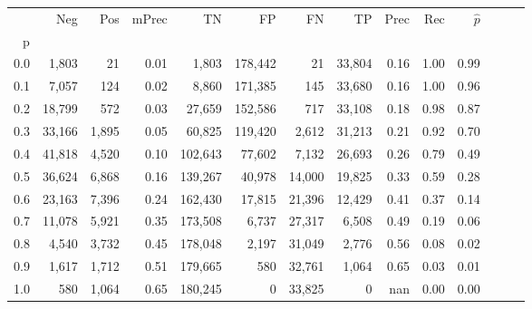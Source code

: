 \begin{tabular}{rrrrrrrrrrrrrr}
\toprule
{} &     Neg &    Pos & mPrec &       TN &       FP &      FN &      TP &  Prec &   Rec & $\hat{p}$ \\
p   &         &        &       &          &          &         &         &       &       &           \\
\midrule
0.0 &   1,803 &     21 &  0.01 &    1,803 &  178,442 &      21 &  33,804 &  0.16 &  1.00 &      0.99 \\
0.1 &   7,057 &    124 &  0.02 &    8,860 &  171,385 &     145 &  33,680 &  0.16 &  1.00 &      0.96 \\
0.2 &  18,799 &    572 &  0.03 &   27,659 &  152,586 &     717 &  33,108 &  0.18 &  0.98 &      0.87 \\
0.3 &  33,166 &  1,895 &  0.05 &   60,825 &  119,420 &   2,612 &  31,213 &  0.21 &  0.92 &      0.70 \\
0.4 &  41,818 &  4,520 &  0.10 &  102,643 &   77,602 &   7,132 &  26,693 &  0.26 &  0.79 &      0.49 \\
0.5 &  36,624 &  6,868 &  0.16 &  139,267 &   40,978 &  14,000 &  19,825 &  0.33 &  0.59 &      0.28 \\
0.6 &  23,163 &  7,396 &  0.24 &  162,430 &   17,815 &  21,396 &  12,429 &  0.41 &  0.37 &      0.14 \\
0.7 &  11,078 &  5,921 &  0.35 &  173,508 &    6,737 &  27,317 &   6,508 &  0.49 &  0.19 &      0.06 \\
0.8 &   4,540 &  3,732 &  0.45 &  178,048 &    2,197 &  31,049 &   2,776 &  0.56 &  0.08 &      0.02 \\
0.9 &   1,617 &  1,712 &  0.51 &  179,665 &      580 &  32,761 &   1,064 &  0.65 &  0.03 &      0.01 \\
1.0 &     580 &  1,064 &  0.65 &  180,245 &        0 &  33,825 &       0 &   nan &  0.00 &      0.00 \\
\bottomrule
\end{tabular}
